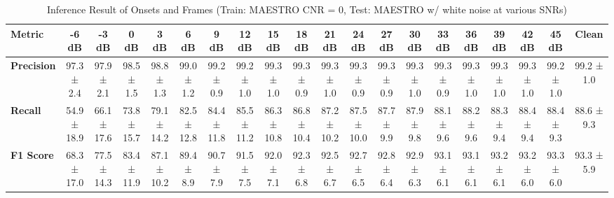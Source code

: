 \documentclass{article}
\begin{document}
\begin{table*}[htbp]
\centering
\caption{Inference Result of Onsets and Frames (Train: MAESTRO CNR = 0, Test: MAESTRO w/ white noise at various SNRs)}
\begin{adjustbox}{max width=\textwidth}
\begin{tabular}{@{}lccccccccccccccccccc@{}}
\toprule
\textbf{Metric} & \textbf{-6 dB} & \textbf{-3 dB} & \textbf{0 dB} & \textbf{3 dB} & \textbf{6 dB} & \textbf{9 dB} & \textbf{12 dB} & \textbf{15 dB} & \textbf{18 dB} & \textbf{21 dB} & \textbf{24 dB} & \textbf{27 dB} & \textbf{30 dB} & \textbf{33 dB} & \textbf{36 dB} & \textbf{39 dB} & \textbf{42 dB} & \textbf{45 dB} & \textbf{Clean} \\ 
\midrule
\textbf{Precision} & 97.3 ± 2.4 & 97.9 ± 2.1 & 98.5 ± 1.5 & 98.8 ± 1.3 & 99.0 ± 1.2 & 99.2 ± 0.9 & 99.2 ± 1.0 & 99.3 ± 1.0 & 99.3 ± 0.9 & 99.3 ± 1.0 & 99.3 ± 0.9 & 99.3 ± 0.9 & 99.3 ± 1.0 & 99.3 ± 0.9 & 99.3 ± 1.0 & 99.3 ± 1.0 & 99.3 ± 1.0 & 99.2 ± 1.0 & 99.2 ± 1.0 \\
\textbf{Recall}    & 54.9 ± 18.9 & 66.1 ± 17.6 & 73.8 ± 15.7 & 79.1 ± 14.2 & 82.5 ± 12.8 & 84.4 ± 11.8 & 85.5 ± 11.2 & 86.3 ± 10.8 & 86.8 ± 10.4 & 87.2 ± 10.2 & 87.5 ± 10.0 & 87.7 ± 9.9 & 87.9 ± 9.8 & 88.1 ± 9.6 & 88.2 ± 9.6 & 88.3 ± 9.4 & 88.4 ± 9.4 & 88.4 ± 9.3 & 88.6 ± 9.3 \\
\textbf{F1 Score}  & 68.3 ± 17.0 & 77.5 ± 14.3 & 83.4 ± 11.9 & 87.1 ± 10.2 & 89.4 ± 8.9 & 90.7 ± 7.9 & 91.5 ± 7.5 & 92.0 ± 7.1 & 92.3 ± 6.8 & 92.5 ± 6.7 & 92.7 ± 6.5 & 92.8 ± 6.4 & 92.9 ± 6.3 & 93.1 ± 6.1 & 93.1 ± 6.1 & 93.2 ± 6.1 & 93.2 ± 6.0 & 93.3 ± 6.0 & 93.3 ± 5.9 \\
\bottomrule
\end{tabular}
\end{adjustbox}
\end{table*}
\end{document}
